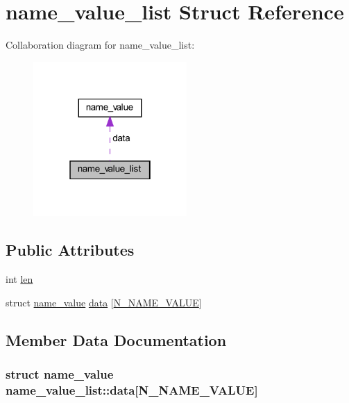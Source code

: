 \hypertarget{structname__value__list}{}\section{name\+\_\+value\+\_\+list Struct Reference}
\label{structname__value__list}


Collaboration diagram for name\+\_\+value\+\_\+list\+:
\nopagebreak
\begin{figure}[H]
\begin{center}
\leavevmode
\includegraphics[width=166pt]{structname__value__list__coll__graph}
\end{center}
\end{figure}
\subsection*{Public Attributes}
\begin{DoxyCompactItemize}
\item 
int \hyperlink{structname__value__list_a4dd90bbb2e805da1ce32638236a0143c}{len}
\item 
struct \hyperlink{structname__value}{name\+\_\+value} \hyperlink{structname__value__list_ab47ef4560bc3725758d2e7fc5edfa875}{data} \mbox{[}\hyperlink{auth-pam_8c_a1c411657bfdbe01cd198f8b34eccb70c}{N\+\_\+\+N\+A\+M\+E\+\_\+\+V\+A\+L\+U\+E}\mbox{]}
\end{DoxyCompactItemize}


\subsection{Member Data Documentation}
\hypertarget{structname__value__list_ab47ef4560bc3725758d2e7fc5edfa875}{}
\subsubsection[{data}]{\setlength{\rightskip}{0pt plus 5cm}struct {\bf name\+\_\+value} name\+\_\+value\+\_\+list\+::data\mbox{[}{\bf N\+\_\+\+N\+A\+M\+E\+\_\+\+V\+A\+L\+U\+E}\mbox{]}}\label{structname__value__list_ab47ef4560bc3725758d2e7fc5edfa875}
\hypertarget{structname__value__list_a4dd90bbb2e805da1ce32638236a0143c}{}
